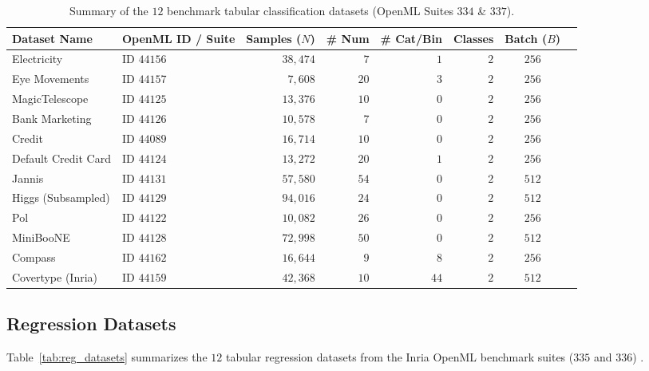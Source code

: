 \documentclass[11pt, a4paper]{article}
\begin{document}
\begin{table}[htbp]
    \centering
    \caption{Summary of the $12$ benchmark tabular classification datasets (OpenML Suites $334$ \& $337$).}
    \label{tab:clf_datasets}
    \vspace{0.2cm}
    \small
    \begin{tabular}{llrrrrcc}
        \toprule
        \textbf{Dataset Name} & \textbf{OpenML ID / Suite} & \textbf{Samples ($N$)} & \textbf{\# Num} & \textbf{\# Cat/Bin} & \textbf{Classes} & \textbf{Batch ($B$)} \\
        \midrule
        Electricity & ID $44156$ \cite{grinsztajn2022why} & $38{,}474$ & $7$ & $1$ & $2$ & $256$ \\
        Eye Movements & ID $44157$ \cite{grinsztajn2022why} & $7{,}608$ & $20$ & $3$ & $2$ & $256$ \\
        MagicTelescope & ID $44125$ \cite{grinsztajn2022why} & $13{,}376$ & $10$ & $0$ & $2$ & $256$ \\
        Bank Marketing & ID $44126$ \cite{grinsztajn2022why} & $10{,}578$ & $7$ & $0$ & $2$ & $256$ \\
        Credit & ID $44089$ \cite{grinsztajn2022why} & $16{,}714$ & $10$ & $0$ & $2$ & $256$ \\
        Default Credit Card & ID $44124$ \cite{grinsztajn2022why} & $13{,}272$ & $20$ & $1$ & $2$ & $256$ \\
        Jannis & ID $44131$ \cite{grinsztajn2022why, jeffares2023tangos} & $57{,}580$ & $54$ & $0$ & $2$ & $512$ \\
        Higgs (Subsampled) & ID $44129$ \cite{grinsztajn2022why, jeffares2023tangos} & $94{,}016$ & $24$ & $0$ & $2$ & $512$ \\
        Pol & ID $44122$ \cite{grinsztajn2022why} & $10{,}082$ & $26$ & $0$ & $2$ & $256$ \\
        MiniBooNE & ID $44128$ \cite{grinsztajn2022why} & $72{,}998$ & $50$ & $0$ & $2$ & $512$ \\
        Compass & ID $44162$ \cite{grinsztajn2022why} & $16{,}644$ & $9$ & $8$ & $2$ & $256$ \\
        Covertype (Inria) & ID $44159$ \cite{grinsztajn2022why} & $42{,}368$ & $10$ & $44$ & $2$ & $512$ \\
        \bottomrule
    \end{tabular}
\end{table}

\subsection{Regression Datasets}
Table~\ref{tab:reg_datasets} summarizes the $12$ tabular regression datasets from the Inria OpenML benchmark suites ($335$ and $336$) \cite{grinsztajn2022why}.
\end{document}
